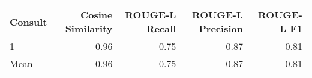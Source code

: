 \begin{tabular}{lrrrr}
\toprule
Consult & Cosine Similarity & ROUGE-L Recall & ROUGE-L Precision & ROUGE-L F1 \\
\midrule
1 & 0.96 & 0.75 & 0.87 & 0.81 \\
Mean & 0.96 & 0.75 & 0.87 & 0.81 \\
\bottomrule
\end{tabular}
